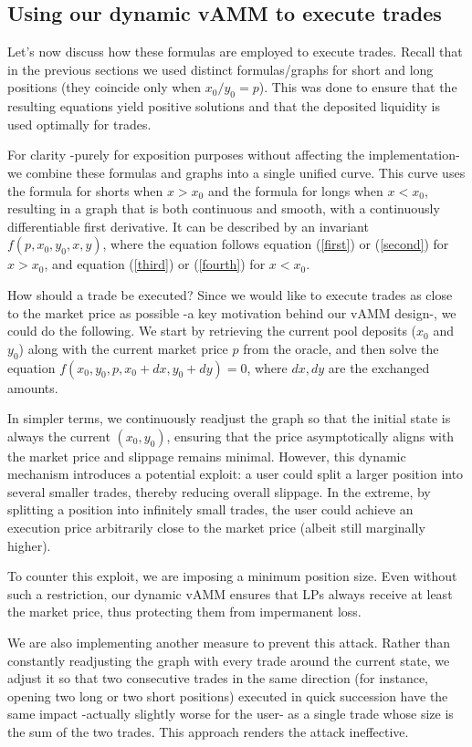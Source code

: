 \documentclass{article}
\begin{document}
\subsection{Using our dynamic vAMM to execute trades}

Let’s now discuss how these formulas are employed to execute trades. Recall that in the previous sections we used distinct formulas/graphs for short and long positions (they coincide only when $x_0/y_0 = p$). This was done to ensure that the resulting equations yield positive solutions and that the deposited liquidity is used optimally for trades.

For clarity -purely for exposition purposes without affecting the implementation- we combine these formulas and graphs into a single unified curve. This curve uses the formula for shorts when $x > x_0$ and the formula for longs when $x < x_0$, resulting in a graph that is both continuous and smooth, with a continuously differentiable first derivative. It can be described by an invariant $f(p, x_0, y_0, x, y)$, where the equation follows equation (\ref{first}) or (\ref{second}) for $x > x_0$, and equation (\ref{third}) or (\ref{fourth}) for $x < x_0$.

How should a trade be executed? Since we would like to execute trades as close to the market price as possible -a key motivation behind our vAMM design-, we could do the following. We start by retrieving the current pool deposits ($x_0$ and $y_0$) along with the current market price $p$ from the oracle, and then solve the equation $f(x_0, y_0, p, x_0 + dx, y_0 + dy) = 0$, where $dx,dy$ are the exchanged amounts.

In simpler terms, we continuously readjust the graph so that the initial state is always the current $(x_0, y_0)$, ensuring that the price asymptotically aligns with the market price and slippage remains minimal. However, this dynamic mechanism introduces a potential exploit: a user could split a larger position into several smaller trades, thereby reducing overall slippage. In the extreme, by splitting a position into infinitely small trades, the user could achieve an execution price arbitrarily close to the market price (albeit still marginally higher).

To counter this exploit, we are imposing a minimum position size. Even without such a restriction, our dynamic vAMM ensures that LPs always receive at least the market price, thus protecting them from impermanent loss.

We are also implementing another measure to prevent this attack. Rather than constantly readjusting the graph with every trade around the current state, we adjust it so that two consecutive trades in the same direction (for instance, opening two long or two short positions) executed in quick succession have the same impact -actually slightly worse for the user- as a single trade whose size is the sum of the two trades. This approach renders the attack ineffective.
\end{document}
